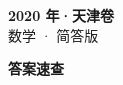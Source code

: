 \documentclass[zihao=-4, a4paper]{ctexart}
\begin{document}
\begin{center}
  {\Large\bfseries 2020 年·天津卷}\\[4pt]
  {\large 数学 · 简答版}
\end{center}
\medskip
{}

\clearpage
{}
\begin{center}{\Large\bfseries 答案速查}\end{center}
\medskip

\end{document}

